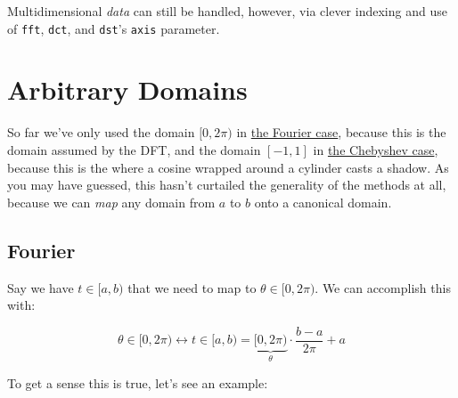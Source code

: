 \documentclass[10pt]{article}
\begin{document}
Multidimensional \textit{data} can still be handled, however, via clever indexing and use of \texttt{fft}, \texttt{dct}, and \texttt{dst}'s \texttt{axis} parameter.

\section{Arbitrary Domains}

So far we've only used the domain $[0, 2\pi)$ in \hyperref[dft]{the Fourier case}, because this is the domain assumed by the DFT, and the domain $[-1, 1]$ in \hyperref[cylinder]{the Chebyshev case}, because this is the where a cosine wrapped around a cylinder casts a shadow. As you may have guessed, this hasn't curtailed the generality of the methods at all, because we can \textit{map} any domain from $a$ to $b$ onto a canonical domain.

\subsection{Fourier}

Say we have $t \in [a, b)$ that we need to map to $\theta \in [0, 2\pi)$. We can accomplish this with:

$$\theta \in [0, 2\pi) \leftrightarrow t \in [a, b) = \underbrace{[0, 2\pi)}_{\theta} \cdot \frac{b - a}{2\pi} + a$$

To get a sense this is true, let's see an example:\vspace{2mm}
\end{document}
